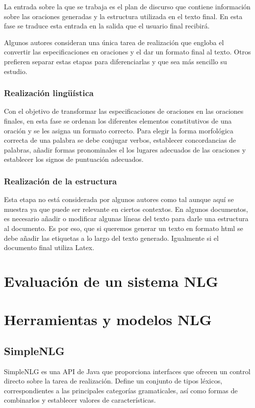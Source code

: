 La entrada sobre la que se trabaja es el plan de discurso que contiene información sobre las oraciones generadas y la estructura utilizada en el texto final. En esta fase se traduce esta entrada en la salida que el usuario final recibirá.

Algunos autores consideran una única tarea de realización que engloba el convertir las especificaciones en oraciones y el dar un formato final al texto. Otros prefieren separar estas etapas para diferenciarlas y que sea más sencillo su estudio.

\subsubsection{Realización lingüística}
Con el objetivo de transformar las especificaciones de oraciones en las oraciones finales, en esta fase se ordenan los diferentes elementos constitutivos de una oración y se les asigna un formato correcto. Para elegir la forma morfológica correcta de una palabra se debe conjugar verbos, establecer concordancias de palabras, añadir formas pronominales el los lugares adecuados de las oraciones y establecer los signos de puntuación adecuados. 

\subsubsection{Realización de la estructura}
Esta etapa no está considerada por algunos autores como tal aunque aquí se muestra ya que puede ser relevante en ciertos contextos. 
En algunos documentos, es necesario añadir o modificar algunas líneas del texto para darle una estructura al documento. Es por eso, que si queremos generar un texto en formato html se debe añadir las etiquetas a lo largo del texto generado. Igualmente si el documento final utiliza Latex.

\section{Evaluación de un sistema NLG}




\section{Herramientas y modelos NLG}
\subsection{SimpleNLG}
SimpleNLG es una API de Java que proporciona interfaces que ofrecen un control directo sobre la tarea de realización. Define un conjunto de tipos léxicos, correspondientes a las principales categorías gramaticales, así como formas de combinarlos y establecer valores de características. 

